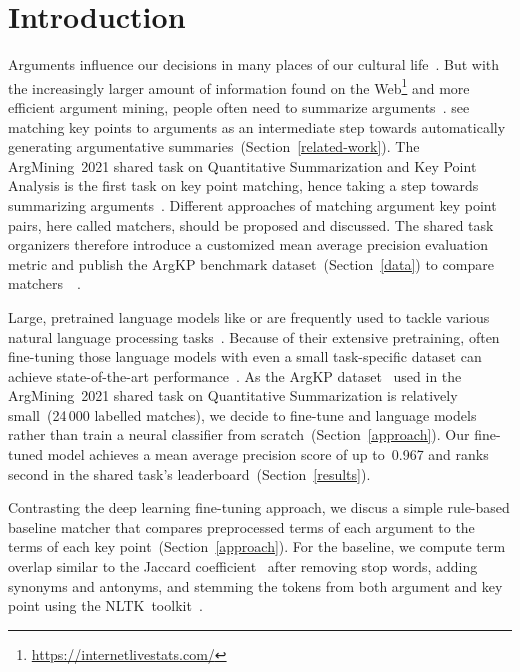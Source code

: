 \section{Introduction}\label{introduction}

Arguments influence our decisions in many places of our cultural life~\cite{Bar-HaimEFKLS2020}.
But with the increasingly larger amount of information found on the Web\footnote{\url{https://internetlivestats.com/}} and more efficient argument mining, people often need to summarize arguments~\cite{LawrenceR2019,Bar-HaimEFKLS2020}.
\citet{Bar-HaimEFKLS2020} see matching key points to arguments as an intermediate step towards automatically generating argumentative summaries~(Section~\ref{related-work}).
The ArgMining~2021 shared task on Quantitative Summarization and Key Point Analysis is the first task on key point matching, hence taking a step towards summarizing arguments~\todocite.
Different approaches of matching argument key point pairs, here called matchers, should be proposed and discussed.
The shared task organizers therefore introduce a customized mean average precision evaluation metric and publish the ArgKP benchmark dataset~(Section~\ref{data}) to compare matchers~\todocite~\cite{Bar-HaimEFKLS2020}.

Large, pretrained language models like \Bert or \Roberta are frequently used to tackle various natural language processing tasks~\cite{DevlinCLT2019,LiuOGDJCLLZS2019}. 
Because of their extensive pretraining, often fine-tuning those language models with even a small task-specific dataset can achieve state-of-the-art performance~\todocite.
As the ArgKP dataset~\cite{Bar-HaimEFKLS2020} used in the ArgMining~2021 shared task on Quantitative Summarization is relatively small~(24\,000 labelled matches), we decide to fine-tune \Bert and \Roberta language models rather than train a neural classifier from scratch~(Section~\ref{approach}).
Our fine-tuned \RobertaBase model achieves a mean average precision score of up to~0.967 and ranks second in the shared task's leaderboard~(Section~\ref{results}).

Contrasting the deep learning fine-tuning approach, we discus a simple rule-based baseline matcher that compares preprocessed terms of each argument to the terms of each key point~(Section~\ref{approach}). For the baseline, we compute term overlap similar to the Jaccard coefficient~\cite{Jaccard1902} after removing stop words, adding synonyms and antonyms, and stemming the tokens from both argument and key point using the NLTK~toolkit~\cite{BirdL2004}.